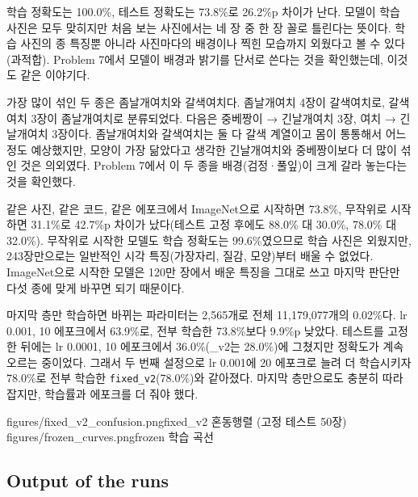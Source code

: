\documentclass[11pt]{article}
\begin{document}
학습 정확도는 100.0\%, 테스트 정확도는 73.8\%로 26.2\%p 차이가 난다. 모델이 학습 사진은 모두 맞히지만 처음 보는 사진에서는 네 장 중 한 장 꼴로 틀린다는 뜻이다. 학습 사진의 종 특징뿐 아니라 사진마다의 배경이나 찍힌 모습까지 외웠다고 볼 수 있다(과적합). Problem 7에서 모델이 배경과 밝기를 단서로 쓴다는 것을 확인했는데, 이것도 같은 이야기다.

\begin{center}\end{center}

가장 많이 섞인 두 종은 좀날개여치와 갈색여치다. 좀날개여치 4장이 갈색여치로, 갈색여치 3장이 좀날개여치로 분류되었다. 다음은 중베짱이 → 긴날개여치 3장, 여치 → 긴날개여치 3장이다. 좀날개여치와 갈색여치는 둘 다 갈색 계열이고 몸이 통통해서 어느 정도 예상했지만, 모양이 가장 닮았다고 생각한 긴날개여치와 중베짱이보다 더 많이 섞인 것은 의외였다. Problem 7에서 이 두 종을 배경(검정·풀잎)이 크게 갈라 놓는다는 것을 확인했다.

같은 사진, 같은 코드, 같은 에포크에서 ImageNet으로 시작하면 73.8\%, 무작위로 시작하면 31.1\%로 42.7\%p 차이가 났다(테스트 고정 후에도 88.0\% 대 30.0\%, 78.0\% 대 32.0\%). 무작위로 시작한 모델도 학습 정확도는 99.6\%였으므로 학습 사진은 외웠지만, 243장만으로는 일반적인 시각 특징(가장자리, 질감, 모양)부터 배울 수 없었다. ImageNet으로 시작한 모델은 120만 장에서 배운 특징을 그대로 쓰고 마지막 판단만 다섯 종에 맞게 바꾸면 되기 때문이다.

마지막 층만 학습하면 바뀌는 파라미터는 2,565개로 전체 11,179,077개의 0.02\%다. lr 0.001, 10 에포크에서 63.9\%로, 전부 학습한 73.8\%보다 9.9\%p 낮았다. 테스트를 고정한 뒤에는 lr 0.0001, 10 에포크에서 36.0\%(\_v2는 28.0\%)에 그쳤지만 정확도가 계속 오르는 중이었다. 그래서 두 번째 설정으로 lr 0.001에 20 에포크로 늘려 더 학습시키자 78.0\%로 전부 학습한 \texttt{fixed\_v2}(78.0\%)와 같아졌다. 마지막 층만으로도 충분히 따라잡지만, 학습률과 에포크를 더 줘야 했다.

           {figures/fixed_v2_confusion.png}{fixed\_v2 혼동행렬 (고정 테스트 50장)}
           {figures/frozen_curves.png}{frozen 학습 곡선}

\subsection*{Output of the runs}
\end{document}
